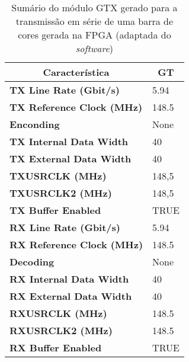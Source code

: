 \begin{table}[h!]
	\centering
	\caption[Sumário do módulo GTX gerado para a transmissão em série de uma barra de cores gerada na FPGA]{Sumário do módulo GTX gerado para a transmissão em série de uma barra de cores gerada na FPGA (adaptada do \textit{software})}
	\label{table:sumario_planoD}
	\begin{tabular}{@{}ll@{}}
		\toprule
		\multicolumn{1}{c}{\textbf{Característica}} & \multicolumn{1}{c}{\textbf{GT}} \\ \midrule
		\textbf{TX Line Rate (Gbit/s)}                & \num{5,94}                            \\
		\textbf{TX Reference Clock (MHz)}           & \num{148.5}                         \\
		\textbf{Enconding}                          & None                            \\
		\textbf{TX Internal Data Width}             & 40                              \\
		\textbf{TX External Data Width}             & 40                              \\
		\textbf{TXUSRCLK (MHz)}                     & 148,5                           \\
		\textbf{TXUSRCLK2 (MHz)}                    & 148,5                           \\
		\textbf{TX Buffer Enabled}                  & TRUE                            \\
		\textbf{RX Line Rate (Gbit/s)}                & \num{5,94}                            \\
		\textbf{RX Reference Clock (MHz)}           & \num{148.5}                           \\
		\textbf{Decoding}                           & None                            \\
		\textbf{RX Internal Data Width}             & 40                              \\
		\textbf{RX External Data Width}             & 40                              \\
		\textbf{RXUSRCLK (MHz)}                     & \num{148.5}                           \\
		\textbf{RXUSRCLK2 (MHz)}                    & \num{148.5}                           \\
		\textbf{RX Buffer Enabled}                  & TRUE                            \\ \bottomrule
	\end{tabular}
\end{table}

